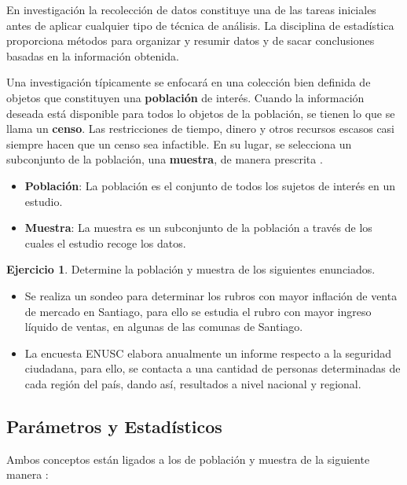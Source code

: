 \documentclass[
  11pt,
]{book}
\providecommand{\tightlist}{%
  \setlength{\itemsep}{0pt}\setlength{\parskip}{0pt}}
\theoremstyle{definition}
\theoremstyle{definition}
\theoremstyle{definition}
\newtheorem{exercise}{Ejercicio}[chapter]
\theoremstyle{definition}
\theoremstyle{remark}
\begin{document}
En investigación la recolección de datos constituye una de las tareas iniciales antes de aplicar cualquier tipo de técnica de análisis. La disciplina de estadística proporciona métodos para organizar y resumir datos y de sacar conclusiones basadas en la información obtenida.

Una investigación típicamente se enfocará en una colección bien definida de objetos que constituyen una \textbf{población} de interés. Cuando la información deseada está disponible para todos lo objetos de la población, se tienen lo que se llama un \textbf{censo}. Las restricciones de tiempo, dinero y otros recursos escasos casi siempre hacen que un censo sea infactible. En su lugar, se selecciona un subconjunto de la población, una \textbf{muestra}, de manera prescrita \citep[página 2]{Devore}.

\begin{itemize}
\tightlist
\item
  \textbf{Población}: La población es el conjunto de todos los sujetos de interés en un estudio.
\item
  \textbf{Muestra}: La muestra es un subconjunto de la población a través de los cuales el estudio recoge los datos.
\end{itemize}

\begin{exercise}
Determine la población y muestra de los siguientes enunciados.
\end{exercise}

\begin{itemize}
\tightlist
\item
  Se realiza un sondeo para determinar los rubros con mayor inflación de venta de mercado en Santiago, para ello se estudia el rubro con mayor ingreso líquido de ventas, en algunas de las comunas de Santiago.
\item
  La encuesta ENUSC elabora anualmente un informe respecto a la seguridad ciudadana, para ello, se contacta a una cantidad de personas determinadas de cada región del país, dando así, resultados a nivel nacional y regional.
\end{itemize}

\subsection{Parámetros y Estadísticos}\label{paruxe1metros-y-estaduxedsticos}

Ambos conceptos están ligados a los de población y muestra de la siguiente manera \citep[página 83]{anderson}:
\end{document}
